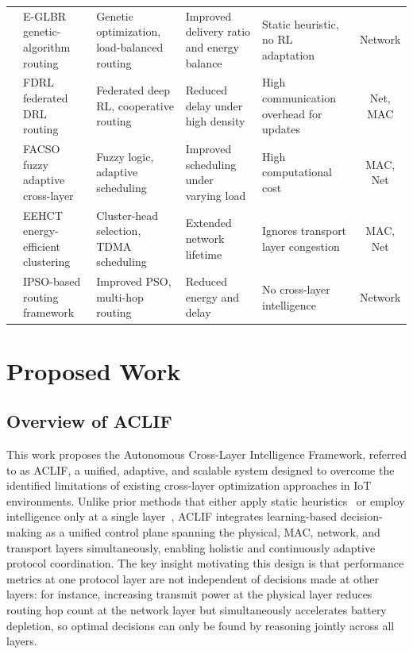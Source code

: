 \documentclass[a4paper]{cas-dc}
\numberwithin{equation}{section}
\begin{document}
\begin{table}[t]
\begin{tabularx}{\textwidth}{@{} c X X X X c @{}}
\cite{Benelhouri2023} & E-GLBR genetic-algorithm routing & Genetic optimization, load-balanced routing & Improved delivery ratio and energy balance & Static heuristic, no RL adaptation & Network \\ \addlinespace
\cite{Suresh2024} & FDRL federated DRL routing & Federated deep RL, cooperative routing & Reduced delay under high density & High communication overhead for updates & Net, MAC \\ \addlinespace
\cite{Yang2024204} & FACSO fuzzy adaptive cross-layer & Fuzzy logic, adaptive scheduling & Improved scheduling under varying load & High computational cost & MAC, Net \\ \addlinespace
\cite{Chaurasiya202325941} & EEHCT energy-efficient clustering & Cluster-head selection, TDMA scheduling & Extended network lifetime & Ignores transport layer congestion & MAC, Net \\ \addlinespace
\cite{Zhang2025} & IPSO-based routing framework & Improved PSO, multi-hop routing & Reduced energy and delay & No cross-layer intelligence & Network \\
\bottomrule
\end{tabularx}
\end{table}
\section{Proposed Work}
\label{sec:proposed}

\subsection{Overview of ACLIF}
\label{subsec:overview}

This work proposes the Autonomous Cross-Layer Intelligence Framework, referred to as ACLIF, a unified, adaptive, and scalable system designed to overcome the identified limitations of existing cross-layer optimization approaches in IoT environments. Unlike prior methods that either apply static heuristics~\cite{Benelhouri2023} or employ intelligence only at a single layer~\cite{Serra2025}, ACLIF integrates learning-based decision-making as a unified control plane spanning the physical, MAC, network, and transport layers simultaneously, enabling holistic and continuously adaptive protocol coordination. The key insight motivating this design is that performance metrics at one protocol layer are not independent of decisions made at other layers: for instance, increasing transmit power at the physical layer reduces routing hop count at the network layer but simultaneously accelerates battery depletion, so optimal decisions can only be found by reasoning jointly across all layers.
\end{document}
